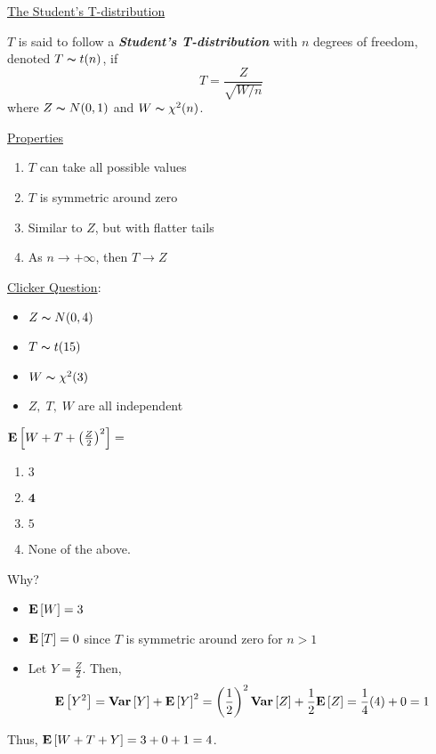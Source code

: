 \underline{The Student's T-distribution}
\begin{defbox}
    \begin{definition}
        $ T $ is said to follow a \textbf{\emph{Student's T-distribution}} with
        $ n $ degrees of freedom, denoted $ T \thicksim t(n) $, if
        \[ T=\frac{Z}{\sqrt{W/n}}  \]
        where $ Z \thicksim N(0,1) $ and $ W \thicksim \chi^2(n) $.
    \end{definition}
\end{defbox}
\underline{Properties}
\begin{enumerate}[label=(\roman*)]
    \item $ T $ can take all possible values
    \item $ T $ is symmetric around zero
    \item Similar to $ Z $, but with flatter tails
    \item As $ n\rightarrow+\infty $, then $ T\rightarrow Z $
\end{enumerate}
\underline{Clicker Question}:
\begin{itemize}
    \item $ Z \thicksim N(0,4) $
    \item $ T \thicksim t(15) $
    \item $ W \thicksim \chi^2(3) $
    \item $ Z,\;T,\;W $ are all independent
\end{itemize}
$ \bm{\mathrm{E}}\left[W+T+\left( \frac{Z}{2} \right)^2\right] = $
\begin{enumerate}[label=(\Alph*)]
    \item $ 3 $
    \item $ \bm{4} $
    \item $ 5 $
    \item None of the above.
\end{enumerate}
Why?
\begin{itemize}
    \item $ \bm{\mathrm{E}}\left[W\right]=3 $
    \item $ \bm{\mathrm{E}}\left[T\right]=0 $ since $ T $ is symmetric around zero for $ n>1 $
    \item Let $ Y=\frac{Z}{2} $. Then,
          \[ \bm{\mathrm{E}}\left[Y^2\right]=\bm{\mathrm{Var}}\left[Y\right]+\bm{\mathrm{E}}\left[Y\right]^2
              =\left( \frac{1}{2} \right)^2 \bm{\mathrm{Var}}\left[Z\right]+\frac{1}{2} \bm{\mathrm{E}}\left[Z\right]
              =\frac{1}{4}(4)+0
              =1 \]
\end{itemize}
Thus, $ \bm{\mathrm{E}}\left[W+T+Y\right]=3+0+1=4 $.
